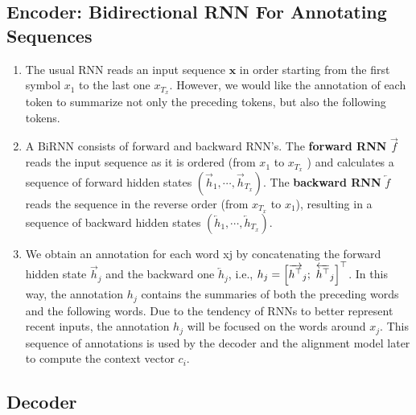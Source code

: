 \subsection*{Encoder: Bidirectional RNN For Annotating Sequences}

\begin{enumerate}
    \item The usual RNN reads an input sequence $\bm{x}$ in order starting from the first symbol $x_1$ to the last one $x_{T_x }$. 
    However, we would like the annotation of each token to summarize not only the preceding tokens, but also the following tokens.
    \hfill \cite{arxiv/1409.0473/NMT-Jointly-Learning-Align-Translate}

    \item A BiRNN consists of forward and backward RNN’s. 
    The \textbf{forward RNN} $\overrightarrow{f}$ reads the input sequence as it is ordered (from $x_1$ to $x_{T_x}$ ) and calculates a sequence of forward hidden states $(\overrightarrow{h} _1, \cdots , \overrightarrow{h}_ {T_x} )$.
    The \textbf{backward RNN} $\overleftarrow{f}$ reads the sequence in the reverse order (from $x_{T_x}$ to $x_1$), resulting in a sequence of backward hidden states $(\overleftarrow{h} _1, \cdots , \overleftarrow{h} _{T_x} )$.
    \hfill \cite{arxiv/1409.0473/NMT-Jointly-Learning-Align-Translate}

    \item We obtain an annotation for each word xj by concatenating the forward hidden state $\overrightarrow{h}_ j$ and the backward one $\overleftarrow{h} _j $, i.e., $h_j = \left[\overrightarrow{h^\top}_ j ;\ \overleftarrow{h^\top}_ j\right]^\top$. 
    In this way, the annotation $h_j$ contains the summaries of both the preceding words and the following words. 
    Due to the tendency of RNNs to better represent recent inputs, the annotation $h_j$ will be focused on the words around $x_j $. 
    This sequence of annotations is used by the decoder and the alignment model later to compute the context vector $c_i$.
    \hfill \cite{arxiv/1409.0473/NMT-Jointly-Learning-Align-Translate}
\end{enumerate}




\subsection*{Decoder}


